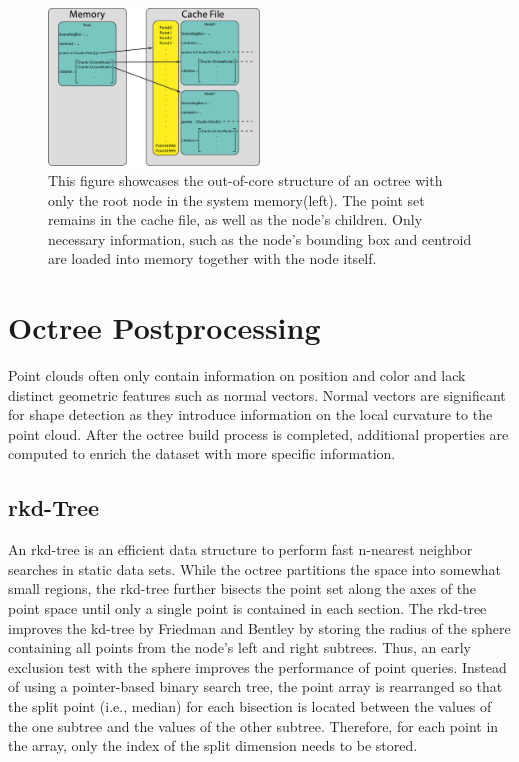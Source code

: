 \begin{figure}
    \centering
    \includegraphics[width=0.5\textwidth]{Octree/out-of-core.png}
    \caption[Graphic describing the out-of-core structure of the octree]
        {This figure showcases the out-of-core structure of an octree with only the root node in the system memory(left). The point set remains in the cache file, as well as the node's children. Only necessary information, such as the node's bounding box and centroid are loaded into memory together with the node itself.}
    \label{fig:out-of-core}
\end{figure}


\section{Octree Postprocessing}
\label{sec:octree_post}
Point clouds often only contain information on position and color and lack distinct geometric features such as normal vectors. Normal vectors are significant for shape detection as they introduce information on the local curvature to the point cloud. After the octree build process is completed, additional properties are computed to enrich the dataset with more specific information. 


\subsection{rkd-Tree}

An rkd-tree \cite{tobler2011rkd} is an efficient data structure to perform fast n-nearest neighbor searches in static data sets. While the octree partitions the space into somewhat small regions, the rkd-tree further bisects the point set along the axes of the point space until only a single point is contained in each section. The rkd-tree improves the kd-tree by Friedman and Bentley \cite{friedman1975algorithm} by storing the radius of the sphere containing all points from the node's left and right subtrees. Thus, an early exclusion test with the sphere improves the performance of point queries. Instead of using a pointer-based binary search tree, the point array is rearranged so that the split point (i.e., median) for each bisection is located between the values of the one subtree and the values of the other subtree. Therefore, for each point in the array, only the index of the split dimension needs to be stored. 


